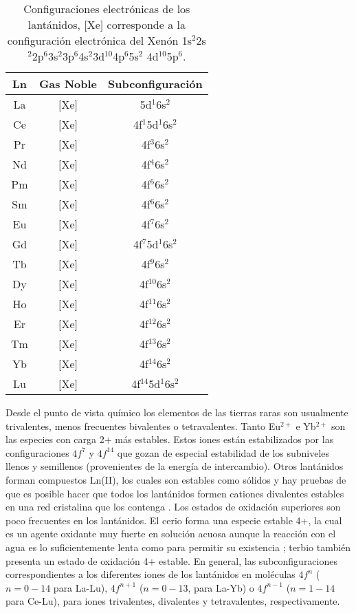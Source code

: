 \linespread{1.0}
\begin{table}[h!]
\centering
\caption{\footnotesize Configuraciones electr\'onicas de los 
lant\'anidos, $[$Xe$]$ corresponde a la configuraci\'on electr\'onica
del Xen\'on 1s$^2$2s$^2$2p$^6$3s$^2$3p$^6$4s$^2$3d$^{10}$4p$^6$5s$^2$
4d$^{10}$5p$^6$.}
\begin{tabular}{c|cc}\hline\hline
Ln & Gas Noble & Subconfiguraci\'on \\ \hline
La & $[$Xe$]$ & 5d$^1$6s$^2$ \\ 
Ce & $[$Xe$]$ & 4f$^1$5d$^1$6s$^2$  \\ 
Pr & $[$Xe$]$ & 4f$^3$6s$^2$ \\ 
Nd & $[$Xe$]$ & 4f$^4$6s$^2$ \\ 
Pm & $[$Xe$]$ & 4f$^5$6s$^2$ \\ 
Sm & $[$Xe$]$ & 4f$^6$6s$^2$ \\ 
Eu & $[$Xe$]$ & 4f$^7$6s$^2$ \\ 
Gd & $[$Xe$]$ & 4f$^7$5d$^1$6s$^2$  \\ 
Tb & $[$Xe$]$ & 4f$^9$6s$^2$ \\ 
Dy & $[$Xe$]$ & 4f$^{10}$6s$^2$ \\ 
Ho & $[$Xe$]$ & 4f$^{11}$6s$^2$ \\ 
Er & $[$Xe$]$ & 4f$^{12}$6s$^2$ \\ 
Tm & $[$Xe$]$ & 4f$^{13}$6s$^2$ \\ 
Yb & $[$Xe$]$ & 4f$^{14}$6s$^2$ \\ 
Lu & $[$Xe$]$ & 4f$^{14}$5d$^1$6s$^2$  \\ 
\hline \end{tabular}\label{tL1}\end{table}
\linespread{1.75}

Desde el punto de vista qu\'imico los elementos de las tierras raras
son usualmente trivalentes, menos frecuentes bivalentes o 
tetravalentes. Tanto Eu$^{2+}$ e Yb$^{2+}$ son las especies con carga
2+ m\'as estables.  Estos iones est\'an estabilizados por las 
configuraciones $4f^7$ y $4f^{14}$ que gozan de especial estabilidad 
de los subniveles llenos y semillenos (provenientes de la energ\'ia 
de intercambio). Otros lant\'anidos forman compuestos Ln(II), los 
cuales son estables como s\'olidos y hay pruebas de que es posible 
hacer que todos los lant\'anidos formen cationes divalentes estables
en una red cristalina que los contenga \citep{Huhe1981}. Los estados 
de oxidaci\'on superiores son poco frecuentes en los lant\'anidos. El
cerio forma una especie estable 4+, la cual es un agente oxidante muy
fuerte en soluci\'on acuosa aunque la reacci\'on con el agua es lo 
suficientemente lenta como para permitir su existencia 
\citep{Huhe1981}; terbio tambi\'en presenta un estado de oxidaci\'on
4+ estable. En general, las subconfiguraciones correspondientes a los
diferentes iones de los lant\'anidos en mol\'eculas $4f^n$ 
($n=0-14$ para La-Lu), $4f^{n+1}$ ($n=0-13$, para La-Yb) o $4f^{n-1}$
($n=1-14$ para Ce-Lu), para iones trivalentes, divalentes y 
tetravalentes, respectivamente.

